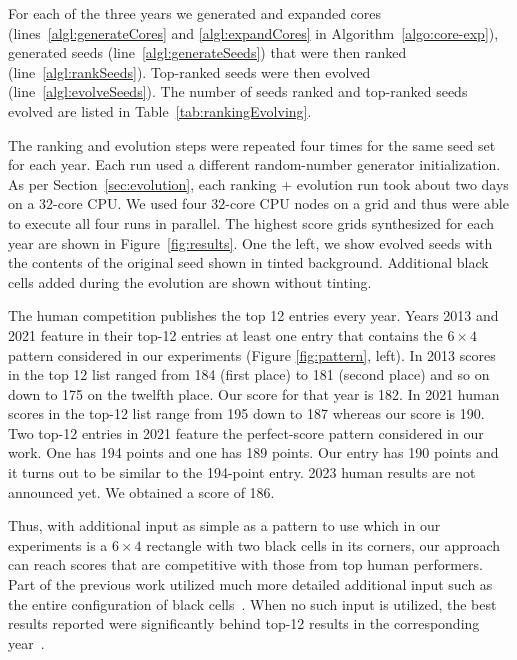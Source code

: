 For each of the three years we generated and expanded cores (lines~\ref{algl:generateCores} and \ref{algl:expandCores} in Algorithm~\ref{algo:core-exp}), generated seeds (line~\ref{algl:generateSeeds}) that were then ranked (line~\ref{algl:rankSeeds}). Top-ranked seeds were then evolved (line~\ref{algl:evolveSeeds}). The number of seeds ranked and top-ranked seeds evolved are listed in Table~\ref{tab:rankingEvolving}.


The ranking and evolution steps were repeated four times for the same seed set for each year. Each run used a different random-number generator initialization. As per Section~\ref{sec:evolution}, each ranking + evolution run took about two days on a $32$-core CPU. We used four $32$-core CPU nodes on a grid and thus were able to execute all four runs in parallel. The highest score grids synthesized for each year are shown in Figure~\ref{fig:results}. One the left, we show evolved seeds with the contents of the original seed shown in tinted background. Additional black cells added during the evolution are shown without tinting.

The human competition publishes the top 12 entries every year.
Years 2013 and 2021 feature in their top-12 entries at least one entry that contains the $6 \times 4$ pattern
considered in our experiments (Figure \ref{fig:pattern}, left).
In 2013 scores in the top 12 list ranged from 184 (first place) to 181 (second place) and so on down to 175 on the twelfth place. 
Our score for that year is 182.
In 2021 human scores in the top-12 list range from 195 down to 187 whereas our score is 190.
Two top-12 entries in 2021 feature the perfect-score pattern considered in our work.
One has 194 points and one has 189 points. Our entry has 190 points and it turns out to be similar to the 194-point entry. 
2023 human results are not announced yet. We obtained a score of 186.

Thus, with additional input as simple as a pattern to use which 
in our experiments
is a $6 \times 4$ rectangle with two black cells in its corners,
our approach can reach scores that are competitive with those from top human performers.
Part of the previous work utilized much more detailed additional input such as the entire configuration of black cells~\cite{DBLP:conf/socs/BoteaB21}.
When no such input is utilized, 
the best results reported were significantly behind top-12 results in the corresponding
year~\cite{DBLP:conf/cig/BulitkoB21,Botea_Bulitko_2022}.




